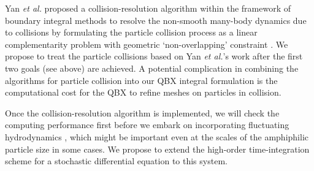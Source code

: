 Yan {\it et al.} proposed
a collision-resolution algorithm within the framework of boundary integral methods to resolve the non-smooth many-body
dynamics due to collisions by formulating the particle collision process as a linear complementarity problem with geometric 
`non-overlapping' constraint \cite{Yan2019}. 
We propose to treat the particle collisions based on Yan {\it et al.}'s work after the first two goals (see above)
are achieved. 
A potential complication in combining the algorithms for particle collision into our 
QBX integral formulation is the computational cost for the QBX to refine meshes on particles in collision.

Once the collision-resolution algorithm is implemented, we will check the computing performance first before we embark on 
incorporating fluctuating hydrodynamics \cite{Bao17,Bao18}, which might be important even at the scales of the amphiphilic 
particle size in some cases. We propose to extend the high-order time-integration scheme for a stochastic differential equation \cite{Fu15} to
this system.

